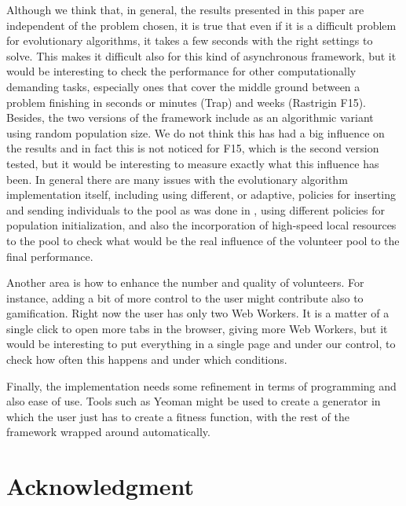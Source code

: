 \documentclass[journal,onecolumn]{IEEEtran}
\begin{document}
Although we think that, in general, the results presented in this
paper are independent of the problem chosen, it is true that even if
it is a difficult problem for evolutionary algorithms, it takes a few
seconds with the right settings to solve. This makes it difficult also
for this kind of asynchronous framework, but it would be interesting
to check the performance for other computationally demanding
tasks, especially ones that cover the middle ground between a problem
finishing in seconds or minutes (Trap) and weeks (Rastrigin F15). 
Besides, the two versions of the framework include as an
algorithmic variant using random population size. We do not think this
has had a big influence on the results and in fact this is not noticed
for F15, which is the second version tested, but it would be interesting to
measure exactly what this influence has been. In general there are
many issues with the evolutionary algorithm implementation itself,
including using different, or adaptive, policies for inserting and
sending individuals to the pool as was done in \cite{araujo2008mam},
using different policies for population initialization, and also the
incorporation of high-speed local resources to the pool to check what
would be the real influence of the volunteer pool to the final
performance. 

Another area is how to enhance the number and quality of
volunteers. For instance, adding a bit of more
control to the user might contribute also to gamification. Right now
the user has only two Web Workers. It is a matter of a single click to
open more tabs in the browser, giving more Web Workers, but it would be
interesting to put everything in a single page and under our control,
to check how often this happens and under which conditions. 

Finally, the implementation needs some refinement in terms of
programming and also ease of use. Tools such as Yeoman might be used %
to create a generator in which the user just has to create a fitness
function, with the rest of the framework wrapped around
automatically.

\section*{Acknowledgment}
\end{document}
